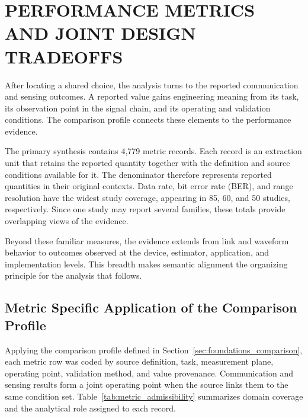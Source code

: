 \section{PERFORMANCE METRICS AND JOINT DESIGN TRADEOFFS}
\label{sec:metrics}
\label{sec:tradeoffs}
After locating a shared choice, the analysis turns to the reported
communication and sensing outcomes. A reported value gains engineering meaning
from its task, its observation point in the signal chain, and its operating and
validation conditions. The comparison profile connects these elements to the
performance evidence.

The primary synthesis contains 4,779 metric records. Each record is an extraction
unit that retains the reported quantity together with the definition and source
conditions available for it. The denominator therefore represents reported
quantities in their original contexts. Data rate, bit error
rate (BER), and range resolution have the widest study coverage, appearing in
85, 60, and 50 studies, respectively. Since one study may report several
families, these totals provide overlapping views of the evidence.

Beyond these familiar measures, the evidence extends from link and waveform
behavior to outcomes observed at the device, estimator, application, and
implementation levels. This breadth makes semantic alignment the organizing
principle for the analysis that follows.

\subsection{Metric Specific Application of the Comparison Profile}

Applying the comparison profile defined in
Section~\ref{sec:foundations_comparison}, each metric row was coded by source
definition, task, measurement plane, operating point, validation method, and
value provenance. Communication and sensing results form a joint operating
point when the source links them to the same condition set.
Table~\ref{tab:metric_admissibility} summarizes domain coverage and the
analytical role assigned to each record.

